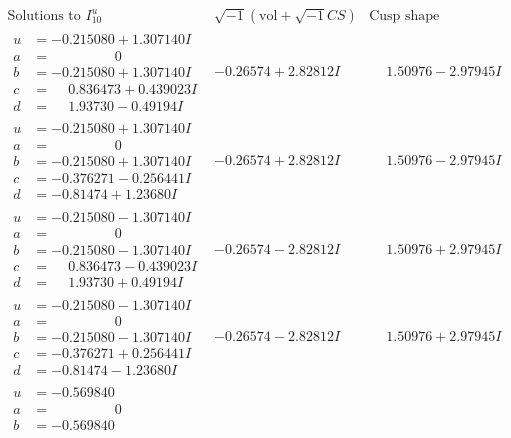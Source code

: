 \documentclass[1p]{elsarticle_modified}
\theoremstyle{definition}
\newcommand{\I}{\sqrt{-1}}
\begin{document}
$$\begin{array}{c|c|c}  
\text{Solutions to }I^u_{10}& \I (\text{vol} + \sqrt{-1}CS) & \text{Cusp shape}\\
 \hline 
\begin{aligned}
u &= -0.215080 + 1.307140 I \\
a &= \phantom{-0.000000 } 0 \\
b &= -0.215080 + 1.307140 I \\
c &= \phantom{-}0.836473 + 0.439023 I \\
d &= \phantom{-}1.93730 - 0.49194 I\end{aligned}
 & -0.26574 + 2.82812 I & \phantom{-}1.50976 - 2.97945 I \\ \hline\begin{aligned}
u &= -0.215080 + 1.307140 I \\
a &= \phantom{-0.000000 } 0 \\
b &= -0.215080 + 1.307140 I \\
c &= -0.376271 - 0.256441 I \\
d &= -0.81474 + 1.23680 I\end{aligned}
 & -0.26574 + 2.82812 I & \phantom{-}1.50976 - 2.97945 I \\ \hline\begin{aligned}
u &= -0.215080 - 1.307140 I \\
a &= \phantom{-0.000000 } 0 \\
b &= -0.215080 - 1.307140 I \\
c &= \phantom{-}0.836473 - 0.439023 I \\
d &= \phantom{-}1.93730 + 0.49194 I\end{aligned}
 & -0.26574 - 2.82812 I & \phantom{-}1.50976 + 2.97945 I \\ \hline\begin{aligned}
u &= -0.215080 - 1.307140 I \\
a &= \phantom{-0.000000 } 0 \\
b &= -0.215080 - 1.307140 I \\
c &= -0.376271 + 0.256441 I \\
d &= -0.81474 - 1.23680 I\end{aligned}
 & -0.26574 - 2.82812 I & \phantom{-}1.50976 + 2.97945 I \\ \hline\begin{aligned}
u &= -0.569840\phantom{ +0.000000I} \\
a &= \phantom{-0.000000 } 0 \\
b &= -0.569840\phantom{ +0.000000I} \\

\end{aligned}
\end{array}$$
\end{document}
